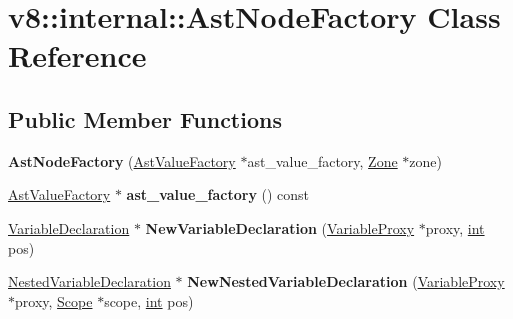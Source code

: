 \hypertarget{classv8_1_1internal_1_1AstNodeFactory}{}\section{v8\+:\+:internal\+:\+:Ast\+Node\+Factory Class Reference}
\label{classv8_1_1internal_1_1AstNodeFactory}
\subsection*{Public Member Functions}
\begin{DoxyCompactItemize}
\item 
\mbox{\label{classv8_1_1internal_1_1AstNodeFactory_a9f6977f7d61cf9766358bd641dd48609}} 
{\bfseries Ast\+Node\+Factory} (\mbox{\hyperlink{classv8_1_1internal_1_1AstValueFactory}{Ast\+Value\+Factory}} $\ast$ast\+\_\+value\+\_\+factory, \mbox{\hyperlink{classv8_1_1internal_1_1Zone}{Zone}} $\ast$zone)
\item 
\mbox{\label{classv8_1_1internal_1_1AstNodeFactory_a21e868ada47daf39aa1b8dd836923899}} 
\mbox{\hyperlink{classv8_1_1internal_1_1AstValueFactory}{Ast\+Value\+Factory}} $\ast$ {\bfseries ast\+\_\+value\+\_\+factory} () const
\item 
\mbox{\label{classv8_1_1internal_1_1AstNodeFactory_a6d18f7e952e26f1da5c19758e94a1542}} 
\mbox{\hyperlink{classv8_1_1internal_1_1VariableDeclaration}{Variable\+Declaration}} $\ast$ {\bfseries New\+Variable\+Declaration} (\mbox{\hyperlink{classv8_1_1internal_1_1VariableProxy}{Variable\+Proxy}} $\ast$proxy, \mbox{\hyperlink{classint}{int}} pos)
\item 
\mbox{\label{classv8_1_1internal_1_1AstNodeFactory_a11eece47a29b9f61f0e724cd60cadc27}} 
\mbox{\hyperlink{classv8_1_1internal_1_1NestedVariableDeclaration}{Nested\+Variable\+Declaration}} $\ast$ {\bfseries New\+Nested\+Variable\+Declaration} (\mbox{\hyperlink{classv8_1_1internal_1_1VariableProxy}{Variable\+Proxy}} $\ast$proxy, \mbox{\hyperlink{classv8_1_1internal_1_1Scope}{Scope}} $\ast$scope, \mbox{\hyperlink{classint}{int}} pos)
\item 
\mbox{\label{classv8_1_1internal_1_1AstNodeFactory_a8fa297419e2546325d4ba2503ba38ab0}} 

\end{DoxyCompactItemize}

